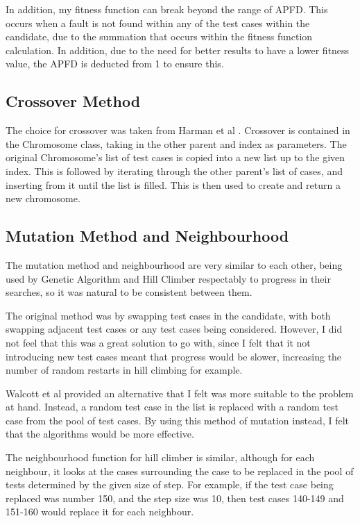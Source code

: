 \documentclass[11pt, a4paper]{article}
\begin{document}
In addition, my fitness function can break beyond the range of APFD. This occurs
when a fault is not found within any of the test cases within the candidate, due
to the summation that occurs within the fitness function calculation. In
addition, due to the need for better results to have a lower fitness value, the
APFD is deducted from 1 to ensure this.

\subsection{Crossover Method}
\label{sub:crossover}
The choice for crossover was taken from Harman et al
\cite[Section~5.1]{Harman:2012:SSE:2379776.2379787}. Crossover is contained in
the Chromosome class, taking in the other parent and index as parameters. The
original Chromosome's list of test cases is copied into a new list up to the
given index. This is followed by iterating through the other parent's list of
cases, and inserting from it until the list is filled. This is then used to
create and return a new chromosome.

\subsection{Mutation Method and Neighbourhood}
\label{sub:mutation}
The mutation method and neighbourhood are very similar to each other, being used
by Genetic Algorithm and Hill Climber respectably to progress in their searches,
so it was natural to be consistent between them.

The original method was by swapping test cases in the candidate, with both
swapping adjacent test cases or any test cases being considered. However, I did
not feel that this was a great solution to go with, since I felt that it not
introducing new test cases meant that progress would be slower, increasing the
number of random restarts in hill climbing for example.

Walcott et al \cite[Figure~4a]{Walcott:2006:TTS:1146238.1146240} provided an
alternative that I felt was more suitable to the problem at hand. Instead, a
random test case in the list is replaced with a random test case from the pool
of test cases. By using this method of mutation instead, I felt that the
algorithms would be more effective.

The neighbourhood function for hill climber is similar, although for each
neighbour, it looks at the cases surrounding the case to be replaced in the
pool of tests determined by the given size of step. For example, if the test
case being replaced was number 150, and the step size was 10, then test cases
140-149 and 151-160 would replace it for each neighbour.
\end{document}
